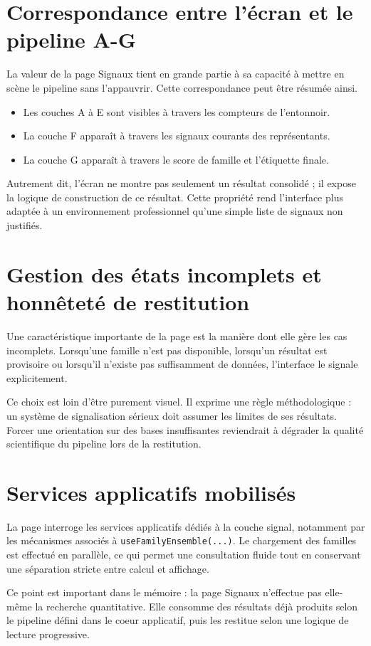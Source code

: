 \section{Correspondance entre l'écran et le pipeline A-G}
La valeur de la page Signaux tient en grande partie à sa capacité à mettre en
scène le pipeline sans l'appauvrir. Cette correspondance peut être résumée ainsi.
\begin{itemize}
\item Les couches A à E sont visibles à travers les compteurs de l'entonnoir.
\item La couche F apparaît à travers les signaux courants des représentants.
\item La couche G apparaît à travers le score de famille et l'étiquette finale.
\end{itemize}

Autrement dit, l'écran ne montre pas seulement un résultat consolidé ; il expose
la logique de construction de ce résultat. Cette propriété rend l'interface plus
adaptée à un environnement professionnel qu'une simple liste de signaux non
justifiés.

\section{Gestion des états incomplets et honnêteté de restitution}
Une caractéristique importante de la page est la manière dont elle gère les cas
incomplets. Lorsqu'une famille n'est pas disponible, lorsqu'un résultat est
provisoire ou lorsqu'il n'existe pas suffisamment de données, l'interface le
signale explicitement.

Ce choix est loin d'être purement visuel. Il exprime une règle méthodologique :
un système de signalisation sérieux doit assumer les limites de ses résultats.
Forcer une orientation sur des bases insuffisantes reviendrait à dégrader la
qualité scientifique du pipeline lors de la restitution.

\section{Services applicatifs mobilisés}
La page interroge les services applicatifs dédiés à la couche signal, notamment
par les mécanismes associés à \texttt{useFamilyEnsemble(...)}. Le chargement des
familles est effectué en parallèle, ce qui permet une consultation fluide tout
en conservant une séparation stricte entre calcul et affichage.

Ce point est important dans le mémoire : la page Signaux n'effectue pas elle-même
la recherche quantitative. Elle consomme des résultats déjà produits selon le
pipeline défini dans le coeur applicatif, puis les restitue selon une logique de
lecture progressive.

